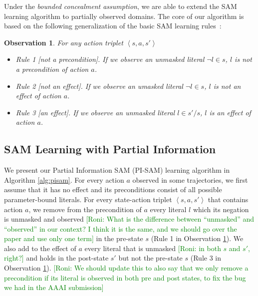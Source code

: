 \documentclass[letterpaper]{article} %
\newtheorem{observation}{Observation}
\newcommand{\tuple}[1]{\ensuremath{\left \langle #1 \right \rangle }}
\newcommand{\pre}{\textit{pre}}
\newcommand{\eff}{\textit{eff}}
\newcommand{\roni}[1]{{\textcolor{green}{[Roni: #1]}}}
\begin{document}
Under the \textit{bounded concealment assumption}, we are able to extend the SAM learning algorithm \cite{juba2021safe} to partially observed domains. The core of our algorithm is based on the following generalization of the basic SAM learning rules~\cite{stern2017efficientAndSafe,juba2021safe}:
\begin{observation}\label{obs:pi-sam-learning-rules}
For any action triplet $\tuple{s, a, s'}$%
\begin{itemize}
    \item Rule 1 [not a precondition]. If we observe an unmasked literal $\neg l \in s$, $l$ is not a precondition of action $a$. %
    
    \item Rule 2 [not an effect]. If we observe an umasked literal $\neg l \in s$, $l$ is not an effect of action $a$.
    
    \item Rule 3 [an effect]. If we observe an unmasked literal $l \in s'/s$, $l$ is an effect of action $a$. 
\end{itemize}
   

\end{observation}



\subsection{SAM Learning with Partial Information}
We present our Partial Information SAM (PI-SAM) learning algorithm in Algorithm \ref{alg:pisam}. For every action $a$ observed in some trajectories, we first assume that it has no effect and its preconditions consist of all possible parameter-bound literals. For every state-action triplet $\tuple{s, a, s'}$ that contains action $a$, we remove from the precondition of $a$ every literal $l$ which its negation is unmasked and observed \roni{What is the difference between ``unmasked'' and ``observed'' in our context? I think it is the same, and we should go over the paper and use only one term} in the pre-state $s$ (Rule 1 in Observation \ref{obs:pi-sam-learning-rules}). We also add to the effect of $a$ every literal that is unmasked \roni{in both $s$ and $s'$, right?} and holds in the post-state $s'$ but not the pre-state $s$ (Rule 3 in Observation \ref{obs:pi-sam-learning-rules}). 
\roni{We should update this to also say that we only remove a precondition if its literal is observed in both pre and post states, to fix the bug we had in the AAAI submission}
\end{document}
